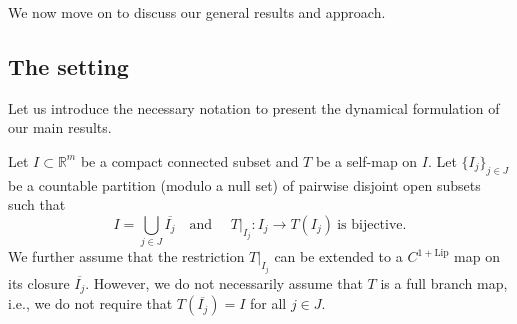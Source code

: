 \documentclass[12pt,a4paper,reqno]{amsart}
\begin{document}


\medskip

We now move on to discuss our general results and approach. 

\subsection{The setting}
Let us introduce the necessary notation to present the dynamical formulation of our main results. 

Let $I \subset \mathbb{R}^m$ be a compact connected  subset and $T$ be a self-map on $I$.
 Let $\{I_j\}_{j \in J}$ be a  countable partition (modulo a null set) of pairwise disjoint open subsets such that 
\[ I=\bigcup_{j \in J} \overline{I_j} \quad  \mbox{and }  \quad  T|_{I_j}: I_j \rightarrow T(I_j) \ \mbox{is bijective} . \] 
We further assume that  the  restriction  $T|_{I_j}$ can be extended to a $C^{1+\text{Lip}}$ map on  its  closure $\overline{I_j}$. However, we do not necessarily assume that $T$ is a full branch map, i.e., we do not require  that $T(\overline{I_j}) = I$ for all $j \in J$. 
\end{document}
